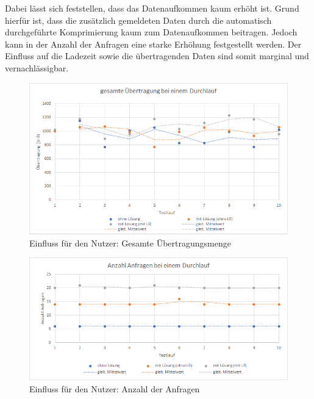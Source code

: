 Dabei lässt sich feststellen, dass das Datenaufkommen kaum erhöht ist. Grund hierfür ist, dass die zusätzlich gemeldeten Daten durch die automatisch durchgeführte Komprimierung\footnotemark{} kaum zum Datenaufkommen beitragen. Jedoch kann in der Anzahl der Anfragen eine starke Erhöhung festgestellt werden. Der Einfluss auf die Ladezeit sowie die übertragenden Daten sind somit marginal und vernachlässigbar.


\begin{figure}[H]
	\centering
	\includegraphics[width=1.00\linewidth]{data/Einfluss-fuer-den-Nutzer/Einfluss-fuer-den-Nutzer_gesamte-Uebertragung.png}
	\caption{Einfluss für den Nutzer: Gesamte Übertragungsmenge}
	\label{fig:Einfluss-fuer-den-Nutzer_gesamte-Uebertragung}
\end{figure}

\begin{figure}[H]
	\centering
	\includegraphics[width=1.00\linewidth]{data/Einfluss-fuer-den-Nutzer/Einfluss-fuer-den-Nutzer_Anzahl-Anfragen.png}
	\caption{Einfluss für den Nutzer: Anzahl der Anfragen}
	\label{fig:Einfluss-fuer-den-Nutzer_Anzahl-Anfragen}
\end{figure}
